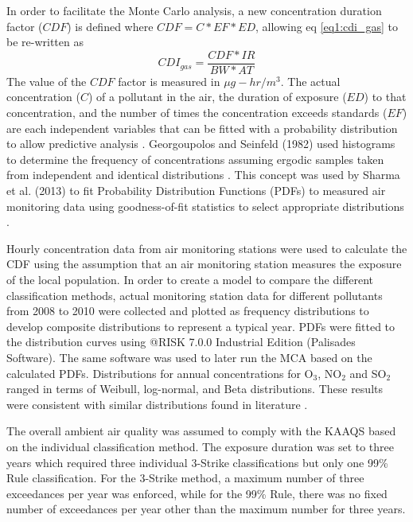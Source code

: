 In order to facilitate the Monte Carlo analysis, a new concentration duration factor ($CDF$) is defined where $CDF = C*EF*ED$, allowing eq \ref{eq1:cdi_gas} to be re-written as
%
\begin{equation}
\label{eq2:cdf_gas}
CDI_{gas} = \frac{CDF*IR}{BW*AT}
\end{equation}
%
The value of the $CDF$ factor is measured in $\mu g-hr/m^{3}$. The actual concentration ($C$) of a pollutant in the air, the duration of exposure ($ED$) to that concentration, and the number of times the concentration exceeds standards ($EF$) are each independent variables that can be fitted with a probability distribution to allow predictive analysis \citep{Lonati2011}. Georgoupolos and Seinfeld (1982) used histograms to determine the frequency of concentrations assuming ergodic samples taken from independent and identical distributions \citep{Georgopoulos1982}. This concept was used by Sharma et al. (2013) to fit Probability Distribution Functions (PDFs) to measured air monitoring data using goodness-of-fit statistics to select appropriate distributions \citep{Sharma2013}. 

Hourly concentration data from air monitoring stations were used to calculate the CDF using the assumption that an air monitoring station measures the exposure of the local population.  In order to create a model to compare the different classification methods, actual monitoring station data for different pollutants from 2008 to 2010 were collected and plotted as frequency distributions to develop composite distributions to represent a typical year. PDFs were fitted to the distribution curves using @RISK 7.0.0 Industrial Edition (Palisades Software). The same software was used to later run the MCA based on the calculated PDFs. Distributions for annual concentrations for O$_{3}$, NO$_{2}$ and SO$_{2}$ ranged in terms of Weibull, log-normal, and Beta distributions. These results were consistent with similar distributions found in literature \citep{Lu2003, Morel1999, Noor2011}.

The overall ambient air quality was assumed to comply with the KAAQS based on the individual classification method. The exposure duration was set to three years which required three individual 3-Strike classifications but only one 99\% Rule classification. For the 3-Strike method, a maximum number of three exceedances per year was enforced, while for the 99\% Rule, there was no fixed number of exceedances per year other than the maximum number for three years.

